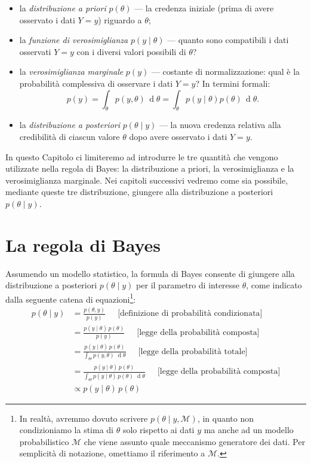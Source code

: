 \documentclass[
  10pt,
  italian,
  a4paper,
  extrafontsizes,onecolumn,openright
  ]{memoir}
\providecommand{\tightlist}{%
  \setlength{\itemsep}{0pt}\setlength{\parskip}{0pt}}
\theoremstyle{definition}
\theoremstyle{definition}
\theoremstyle{definition}
\theoremstyle{definition}
\theoremstyle{remark}
\begin{document}
\begin{itemize}
\tightlist
\item
  la \emph{distribuzione a priori} \(p(\theta)\) --- la credenza iniziale (prima di avere osservato i dati \(Y = y\)) riguardo a \(\theta\);
\item
  la \emph{funzione di verosimiglianza} \(p(y \mid \theta)\) --- quanto sono compatibili i dati osservati \(Y = y\) con i diversi valori possibili di \(\theta\)?
\item
  la \emph{verosimiglianza marginale} \(p(y)\) --- costante di normalizzazione: qual è la probabilità complessiva di osservare i dati \(Y = y\)? In termini formali:
  \[
  p(y) = \int_\theta p(y, \theta) \,\operatorname {d}\!\theta = \int_\theta p(y \mid \theta) p(\theta) \,\operatorname {d}\!\theta.
  \]
\item
  la \emph{distribuzione a posteriori} \(p(\theta \mid y)\) --- la nuova credenza relativa alla credibilità di ciascun valore \(\theta\) dopo avere osservato i dati \(Y = y\).
\end{itemize}

In questo Capitolo ci limiteremo ad introdurre le tre quantità che vengono utilizzate nella regola di Bayes: la distribuzione a priori, la verosimiglianza e la verosimiglianza marginale. Nei capitoli successivi vedremo come sia possibile, mediante queste tre distribuzione, giungere alla distribuzione a posteriori \(p(\theta \mid y)\).

\hypertarget{la-regola-di-bayes}{%
\section{La regola di Bayes}\label{la-regola-di-bayes}}

Assumendo un modello statistico, la formula di Bayes consente di giungere alla distribuzione a posteriori \(p(\theta \mid y)\) per il parametro di interesse \(\theta\), come indicato dalla seguente catena di equazioni\footnote{In realtà, avremmo dovuto scrivere \(p(\theta \mid y, \mathcal{M})\), in quanto non condizioniamo la stima di \(\theta\) solo rispetto ai dati \(y\) ma anche ad un modello probabilistico \(\mathcal{M}\) che viene assunto quale meccanismo generatore dei dati. Per semplicità di notazione, omettiamo il riferimento a \(\mathcal{M}\).}:
\begin{align}
p(\theta \mid y)  &= \displaystyle \frac{p(\theta,y)}{p(y)}
 \ \ \ \ \ \mbox{ [definizione di probabilità condizionata]}
\\
&= \displaystyle \frac{p(y \mid \theta) \, p(\theta)}{p(y)}
 \ \ \ \ \ \mbox{ [legge della probabilità composta]}
\\
&=  \displaystyle \frac{p(y \mid\theta) \, p(\theta)}
                        {\int_{\Theta} p(y,\theta) \, \,\operatorname {d}\!\theta}
 \ \ \ \ \ \mbox{ [legge della probabilità totale]}
\\
&= \displaystyle \frac{p(y \mid\theta) \, p(\theta)}
                        {\int_{\Theta} p(y \mid\theta) \, p(\theta) \, \,\operatorname {d}\!\theta}
 \ \ \ \ \ \mbox{ [legge della probabilità composta]}
\\
& \propto \displaystyle p(y \mid\theta) \, p(\theta)
\label{eq:bayesmodel}
\end{align}
\end{document}
